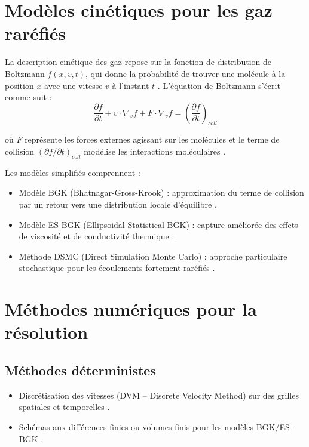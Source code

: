 \documentclass[12pt,a4paper]{report}
\begin{document}
	\section{Modèles cinétiques pour les gaz raréfiés}
	
	La description cinétique des gaz repose sur la fonction de distribution de Boltzmann $f(x,v,t)$, qui donne la probabilité de trouver une molécule à la position $x$ avec une vitesse $v$ à l’instant $t$ \cite{chapman1970}. L’équation de Boltzmann s’écrit comme suit :
	\begin{equation}
		\frac{\partial f}{\partial t} + v \cdot \nabla_x f + F \cdot \nabla_v f = \left( \frac{\partial f}{\partial t} \right)_{coll}
	\end{equation}
	
	où $F$ représente les forces externes agissant sur les molécules et le terme de collision $(\partial f / \partial t)_{coll}$ modélise les interactions moléculaires \cite{chapman1970, bird1994}.
	
	Les modèles simplifiés comprennent :
	\begin{itemize}
		\item Modèle BGK (Bhatnagar-Gross-Krook) : approximation du terme de collision par un retour vers une distribution locale d’équilibre \cite{bird1994, holway1966}.
		\item Modèle ES-BGK (Ellipsoidal Statistical BGK) : capture améliorée des effets de viscosité et de conductivité thermique \cite{holway1966}.
		\item Méthode DSMC (Direct Simulation Monte Carlo) : approche particulaire stochastique pour les écoulements fortement raréfiés \cite{garcia1999, boyd1995}.
	\end{itemize}
	
	\section{Méthodes numériques pour la résolution}
	
	\subsection{Méthodes déterministes}
	\begin{itemize}
		\item Discrétisation des vitesses (DVM – Discrete Velocity Method) sur des grilles spatiales et temporelles \cite{rogallo1994}.
		\item Schémas aux différences finies ou volumes finis pour les modèles BGK/ES-BGK \cite{bird1994, holway1966}.
	\end{itemize}
	
\end{document}
